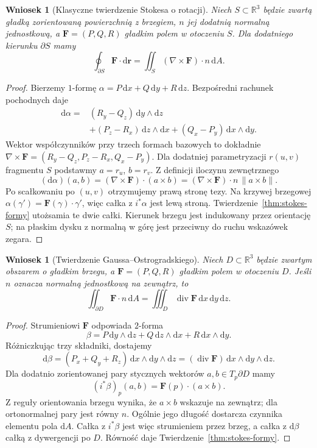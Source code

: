 \documentclass[11pt,a4paper,oneside]{report}
\newcommand{\R}{\mathbb{R}}
\newcommand{\dd}{\mathrm d}
\theoremstyle{plain}
\newtheorem{wniosek}[twierdzenie]{Wniosek}
\theoremstyle{definition}
\theoremstyle{remark}
\begin{document}
\begin{wniosek}[Klasyczne twierdzenie Stokesa o rotacji]
\label{cor:stokes-curl}
Niech $S\subset\R^3$ będzie zwartą gładką
zorientowaną powierzchnią z brzegiem,
$n$ jej dodatnią normalną jednostkową,
a $\mathbf F=(P,Q,R)$ gładkim polem w otoczeniu $S$.
Dla dodatniego kierunku $\partial S$ mamy
\[
 \oint_{\partial S}\mathbf F\cdot\dd\mathbf r
 =\iint_S(\nabla\times\mathbf F)\cdot n\,\dd A.
\]
\end{wniosek}
\begin{proof}
Bierzemy $1$-formę
$\alpha=P\,\dd x+Q\,\dd y+R\,\dd z$.
Bezpośredni rachunek pochodnych daje
\[
 \begin{aligned}
 \dd\alpha={}&(R_y-Q_z)\,\dd y\wedge\dd z\\
 &+(P_z-R_x)\,\dd z\wedge\dd x
 +(Q_x-P_y)\,\dd x\wedge\dd y.
 \end{aligned}
\]
Wektor współczynników przy trzech formach
bazowych to dokładnie
$\nabla\times\mathbf F
=(R_y-Q_z,P_z-R_x,Q_x-P_y)$.
Dla dodatniej parametryzacji
$r(u,v)$ fragmentu $S$ podstawmy
$a=r_u$, $b=r_v$. Z definicji iloczynu
zewnętrznego
\[
 (\dd\alpha)(a,b)
 =(\nabla\times\mathbf F)\cdot(a\times b)
 =(\nabla\times\mathbf F)\cdot n\,
    \lVert a\times b\rVert.
\]
Po scałkowaniu po $(u,v)$ otrzymujemy prawą
stronę tezy. Na krzywej brzegowej
$\alpha(\gamma')=\mathbf F(\gamma)\cdot\gamma'$,
więc całka z $i^*\alpha$ jest lewą stroną.
Twierdzenie~\ref{thm:stokes-formy} utożsamia
te dwie całki. Kierunek brzegu jest
indukowany przez orientację $S$; na płaskim
dysku z normalną w górę jest przeciwny
do ruchu wskazówek zegara.
\end{proof}

\begin{wniosek}[Twierdzenie Gaussa--Ostrogradskiego]
\label{cor:stokes-gauss}
Niech $D\subset\R^3$ będzie zwartym obszarem
o gładkim brzegu, a $\mathbf F=(P,Q,R)$
gładkim polem w otoczeniu $D$.
Jeśli $n$ oznacza normalną jednostkową
na zewnątrz, to
\[
 \iint_{\partial D}\mathbf F\cdot n\,\dd A
 =\iiint_D\operatorname{div}\mathbf F\,
                  \dd x\,\dd y\,\dd z.
\]
\end{wniosek}
\begin{proof}
Strumieniowi $\mathbf F$ odpowiada $2$-forma
\[
 \beta=P\,\dd y\wedge\dd z
      +Q\,\dd z\wedge\dd x
      +R\,\dd x\wedge\dd y.
\]
Różniczkując trzy składniki, dostajemy
\[
 \dd\beta=(P_x+Q_y+R_z)\,
           \dd x\wedge\dd y\wedge\dd z
          =(\operatorname{div}\mathbf F)\,
           \dd x\wedge\dd y\wedge\dd z.
\]
Dla dodatnio zorientowanej pary stycznych
wektorów $a,b\in T_p\partial D$ mamy
\[
 (i^*\beta)_p(a,b)
 =\mathbf F(p)\cdot(a\times b).
\]
Z reguły orientowania brzegu wynika, że
$a\times b$ wskazuje na zewnątrz; dla
ortonormalnej pary jest równy $n$.
Ogólnie jego długość dostarcza czynnika
elementu pola $\dd A$. Całka z $i^*\beta$
jest więc strumieniem przez brzeg, a całka
z $\dd\beta$ całką z dywergencji po $D$.
Równość daje Twierdzenie~\ref{thm:stokes-formy}.
\end{proof}
\end{document}

